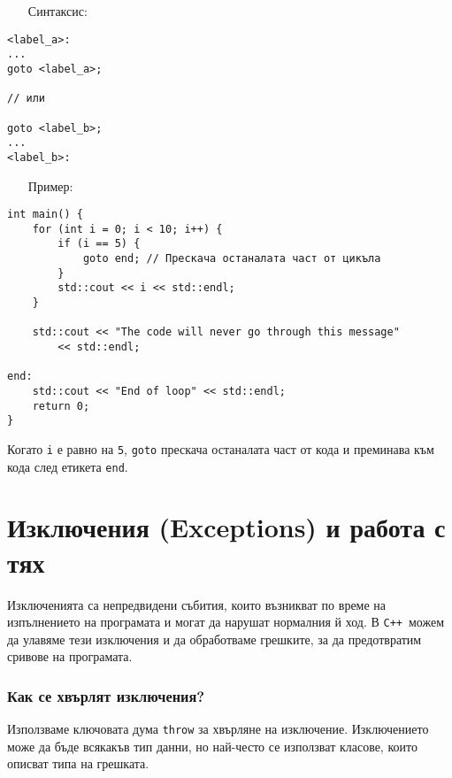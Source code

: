 \documentclass[oneside]{book}
\newcommand*{\code}[1]{\texttt{#1}}
\newcommand*{\cpp}{\texttt{C++}\ }
\begin{document}
\begin{itemize}\item[Синтаксис:]\end{itemize}\vspace{-4pt}
\begin{mdframed}\begin{lstlisting}
<label_a>:
...
goto <label_a>;

// или

goto <label_b>;
...
<label_b>:
\end{lstlisting}\end{mdframed}
\pagebreak
\begin{itemize}\item[Пример:]\end{itemize}
\begin{mdframed}\begin{lstlisting}
int main() {
    for (int i = 0; i < 10; i++) {
        if (i == 5) {
            goto end; // Прескача останалата част от цикъла
        }
        std::cout << i << std::endl;
    }

    std::cout << "The code will never go through this message"
        << std::endl;

end:
    std::cout << "End of loop" << std::endl;
    return 0;
}
\end{lstlisting}\end{mdframed}

Когато \code{i} е равно на \code{5}, \code{goto} прескача останалата част от кода и преминава към кода след етикета \code{end}.

\section{Изключения (Exceptions) и работа с тях}\label{sec:exceptions}
Изключенията са непредвидени събития, които възникват по време на изпълнението на програмата и могат да нарушат нормалния й ход. В \cpp можем да улавяме тези изключения и да обработваме грешките, за да предотвратим сривове на програмата.

\subsubsection{Как се хвърлят изключения?}
Използваме ключовата дума \code{throw} за хвърляне на изключение.
Изключението може да бъде всякакъв тип данни, но най-често се използват класове, които описват типа на грешката.
\end{document}
